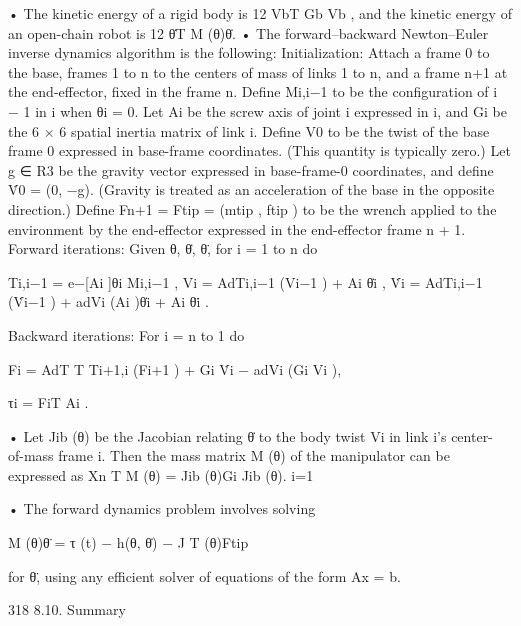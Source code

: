 \documentclass[12pt,a4paper]{article}
\begin{document}
    • The kinetic energy of a rigid body is 12 VbT Gb Vb , and the kinetic energy of
      an open-chain robot is 12 θ̇T M (θ)θ̇.
    • The forward–backward Newton–Euler inverse dynamics algorithm is the
      following:
      Initialization: Attach a frame {0} to the base, frames {1} to {n} to the
      centers of mass of links {1} to {n}, and a frame {n+1} at the end-effector,
      fixed in the frame {n}. Define Mi,i−1 to be the configuration of {i − 1}
      in {i} when θi = 0. Let Ai be the screw axis of joint i expressed in {i},
      and Gi be the 6 × 6 spatial inertia matrix of link i. Define V0 to be the
      twist of the base frame {0} expressed in base-frame coordinates. (This
      quantity is typically zero.) Let g ∈ R3 be the gravity vector expressed in
      base-frame-{0} coordinates, and define V̇0 = (0, −g). (Gravity is treated
      as an acceleration of the base in the opposite direction.) Define Fn+1 =
      Ftip = (mtip , ftip ) to be the wrench applied to the environment by the
      end-effector expressed in the end-effector frame {n + 1}.
       Forward iterations: Given θ, θ̇, θ̈, for i = 1 to n do

                        Ti,i−1      = e−[Ai ]θi Mi,i−1 ,
                             Vi     =     AdTi,i−1 (Vi−1 ) + Ai θ̇i ,
                             V̇i    =     AdTi,i−1 (V̇i−1 ) + adVi (Ai )θ̇i + Ai θ̈i .

       Backward iterations: For i = n to 1 do

                          Fi       =    AdT                           T
                                          Ti+1,i (Fi+1 ) + Gi V̇i − adVi (Gi Vi ),

                           τi      = FiT Ai .

    • Let Jib (θ) be the Jacobian relating θ̇ to the body twist Vi in link i’s center-
      of-mass frame {i}. Then the mass matrix M (θ) of the manipulator can
      be expressed as
                                        Xn
                                               T
                               M (θ) =       Jib (θ)Gi Jib (θ).
                                                  i=1

    • The forward dynamics problem involves solving

                                   M (θ)θ̈ = τ (t) − h(θ, θ̇) − J T (θ)Ftip

       for θ̈, using any efficient solver of equations of the form Ax = b.


318                                                                                  8.10. Summary
\end{document}
